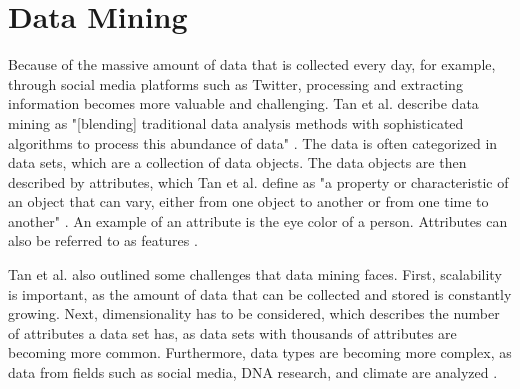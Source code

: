 \section{Data Mining}
Because of the massive amount of data that is collected every day, for example, through social media platforms such as Twitter, processing and extracting information becomes more valuable and challenging. Tan et al. describe data mining as "[blending] traditional data analysis methods with sophisticated algorithms to process this abundance of data" \cite[p.~21]{DBLP:books/aw/TanSKK2019}. The data is often categorized in data sets, which are a collection of data objects. The data objects are then described by attributes, which Tan et al. define as "a property or characteristic of an object that can vary, either from one object to another or from one time to another" \cite[p.~47]{DBLP:books/aw/TanSKK2019}. An example of an attribute is the eye color of a person. Attributes can also be referred to as features \cite{DBLP:books/aw/TanSKK2019}.


Tan et al. also outlined some challenges that data mining faces. First, scalability is important, as the amount of data that can be collected and stored is constantly growing. Next, dimensionality has to be considered, which describes the number of attributes a data set has, as data sets with thousands of attributes are becoming more common. Furthermore, data types are becoming more complex, as data from fields such as social media, DNA research, and climate are analyzed \cite{DBLP:books/aw/TanSKK2019}.


